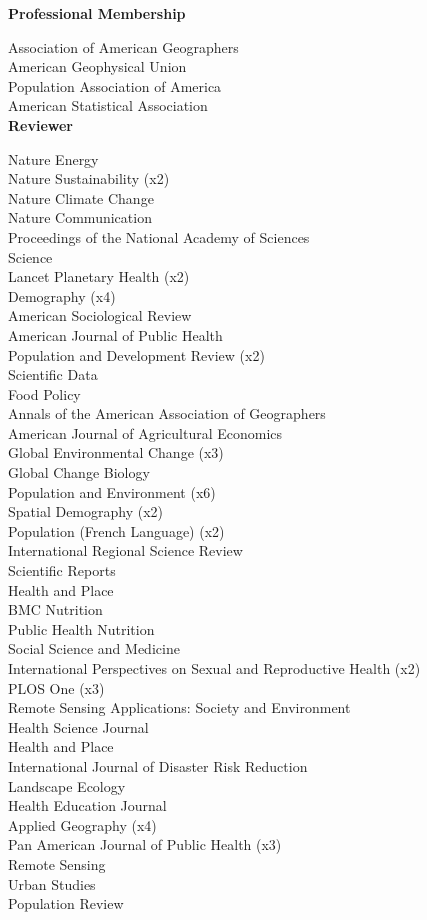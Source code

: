 \documentclass[11pt]{article} %
\begin{document}
\noindent
\textbf{Professional Membership}

\noindent
Association of American Geographers\\
American Geophysical Union\\
Population Association of America\\
American Statistical Association\\

\vspace{.5 cm}
\noindent
\textbf {Reviewer}

\noindent 
Nature Energy\\
Nature Sustainability (x2)\\
Nature Climate Change\\
Nature Communication\\
Proceedings of the National Academy of Sciences\\
Science\\ 
Lancet Planetary Health (x2)\\
Demography (x4)\\
American Sociological Review\\
American Journal of Public Health\\
Population and Development Review (x2)\\ 
Scientific Data\\
Food Policy\\
Annals of the American Association of Geographers\\
American Journal of Agricultural Economics\\
Global Environmental Change (x3)\\
Global Change Biology\\
Population and Environment (x6)\\
Spatial Demography (x2)\\
Population (French Language) (x2)\\
International Regional Science Review\\
Scientific Reports\\
Health and Place\\
BMC Nutrition\\ 
Public Health Nutrition\\
Social Science and Medicine\\
International Perspectives on Sexual and Reproductive Health (x2)\\ 
PLOS One (x3)\\
Remote Sensing Applications: Society and Environment\\
Health Science Journal\\
Health and Place\\
International Journal of Disaster Risk Reduction\\
Landscape Ecology\\
Health Education Journal\\
Applied Geography (x4)\\ 
Pan American Journal of Public Health (x3)\\ 
Remote Sensing\\
Urban Studies\\
Population Review\\
\end{document}
